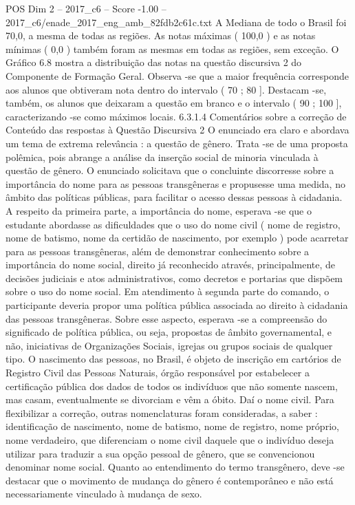 \begin{textsample}{POS Dim 2 – 2017\_c6 – Score -1.00 – 2017\_c6/enade\_2017\_eng\_amb\_82fdb2c61c.txt}
A Mediana de todo o Brasil foi 70,0, a mesma de todas as regiões.
As notas máximas ( 100,0 ) e as notas mínimas ( 0,0 ) também foram as mesmas em todas as regiões, sem exceção.
O Gráfico 6.8 mostra a distribuição das notas na questão discursiva 2 do Componente de Formação Geral.
Observa -se que a maior frequência corresponde aos alunos que obtiveram nota dentro do intervalo ( 70 ; 80 ].
Destacam -se, também, os alunos que deixaram a questão em branco e o intervalo ( 90 ; 100 ], caracterizando -se como máximos locais. 6.3.1.4 Comentários sobre a correção de Conteúdo das respostas à Questão Discursiva 2 O enunciado era claro e abordava um tema de extrema relevância : a questão de gênero.
Trata -se de uma proposta polêmica, pois abrange a análise da inserção social de minoria vinculada à questão de gênero.
O enunciado solicitava que o concluinte discorresse sobre a importância do nome para as pessoas transgêneras e propusesse uma medida, no âmbito das políticas públicas, para facilitar o acesso dessas pessoas à cidadania.
A respeito da primeira parte, a importância do nome, esperava -se que o estudante abordasse as dificuldades que o uso do nome civil ( nome de registro, nome de batismo, nome da certidão de nascimento, por exemplo ) pode acarretar para as pessoas transgêneras, além de demonstrar conhecimento sobre a importância do nome social, direito já reconhecido através, principalmente, de decisões judiciais e atos administrativos, como decretos e portarias que dispõem sobre o uso do nome social.
Em atendimento à segunda parte do comando, o participante deveria propor uma política pública associada ao direito à cidadania das pessoas transgêneras.
Sobre esse aspecto, esperava -se a compreensão do significado de política pública, ou seja, propostas de âmbito governamental, e não, iniciativas de Organizações Sociais, igrejas ou grupos sociais de qualquer tipo.
O nascimento das pessoas, no Brasil, é objeto de inscrição em cartórios de Registro Civil das Pessoas Naturais, órgão responsável por estabelecer a certificação pública dos dados de todos os indivíduos que não somente nascem, mas casam, eventualmente se divorciam e vêm a óbito.
Daí o nome civil.
Para flexibilizar a correção, outras nomenclaturas foram consideradas, a saber : identificação de nascimento, nome de batismo, nome de registro, nome próprio, nome verdadeiro, que diferenciam o nome civil daquele que o indivíduo deseja utilizar para traduzir a sua opção pessoal de gênero, que se convencionou denominar nome social.
Quanto ao entendimento do termo transgênero, deve -se destacar que o movimento de mudança do gênero é contemporâneo e não está necessariamente vinculado à mudança de sexo.

\end{textsample}
